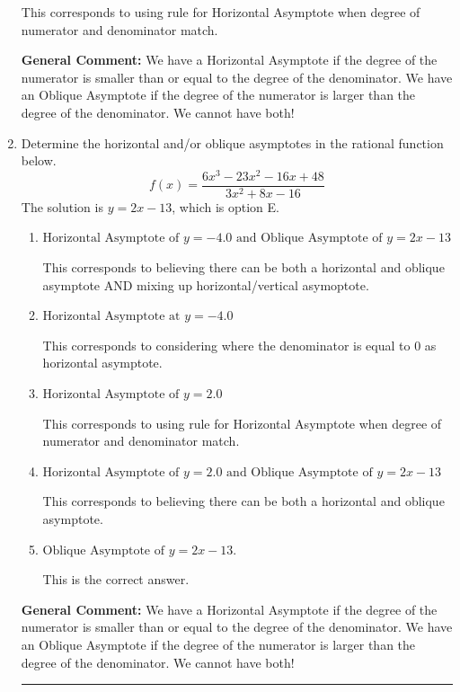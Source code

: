 \documentclass{extbook}[14pt]
\newcommand{\litem}[1]{\item #1

\rule{\textwidth}{0.4pt}}
\begin{document}
\begin{enumerate}
{\begin{enumerate}[label=\Alph*.]
This corresponds to using rule for Horizontal Asymptote when degree of numerator and denominator match.
\end{enumerate}

\textbf{General Comment:} We have a Horizontal Asymptote if the degree of the numerator is smaller than or equal to the degree of the denominator. We have an Oblique Asymptote if the degree of the numerator is larger than the degree of the denominator. We cannot have both!
}
\litem{
Determine the horizontal and/or oblique asymptotes in the rational function below.
\[ f(x) = \frac{6x^{3} -23 x^{2} -16 x + 48}{3x^{2} +8 x -16} \]The solution is \( y = 2x -13 \), which is option E.\begin{enumerate}[label=\Alph*.]
\item \( \text{Horizontal Asymptote of } y = -4.0 \text{ and Oblique Asymptote of } y = 2x -13 \)

This corresponds to believing there can be both a horizontal and oblique asymptote AND mixing up horizontal/vertical asymoptote.
\item \( \text{Horizontal Asymptote at } y = -4.0 \)

This corresponds to considering where the denominator is equal to 0 as horizontal asymptote.
\item \( \text{Horizontal Asymptote of } y = 2.0  \)

This corresponds to using rule for Horizontal Asymptote when degree of numerator and denominator match.
\item \( \text{Horizontal Asymptote of } y = 2.0 \text{ and Oblique Asymptote of } y = 2x -13 \)

This corresponds to believing there can be both a horizontal and oblique asymptote.
\item \( \text{Oblique Asymptote of } y = 2x -13. \)

This is the correct answer.
\end{enumerate}

\textbf{General Comment:} We have a Horizontal Asymptote if the degree of the numerator is smaller than or equal to the degree of the denominator. We have an Oblique Asymptote if the degree of the numerator is larger than the degree of the denominator. We cannot have both!
}
\end{enumerate}
\end{document}
